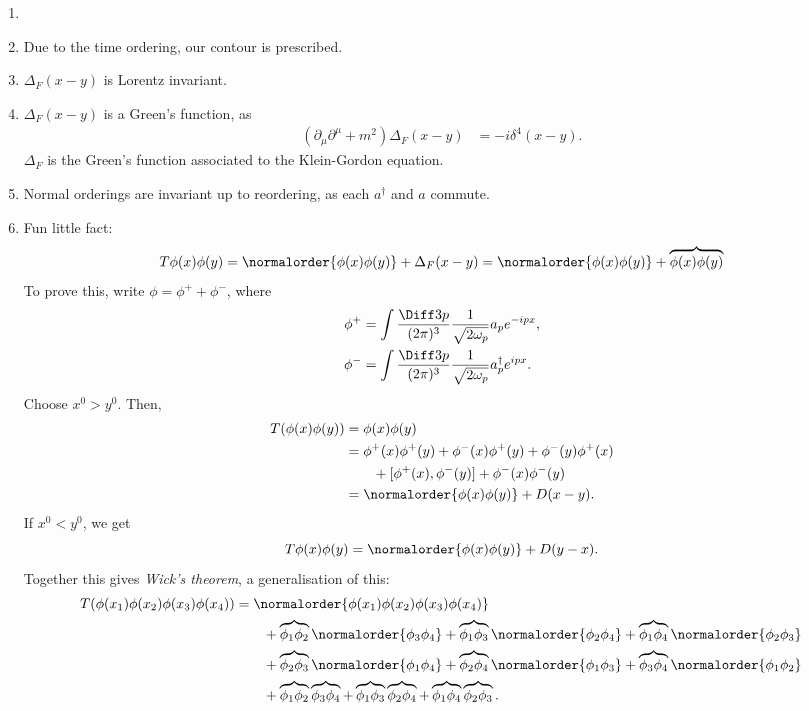 \documentclass[12pt]{article}
\begin{document}
\begin{remark}
	\begin{enumerate}
		\item[]
		\item Due to the time ordering, our contour is prescribed.
		\item $\Delta_F(x - y)$ is Lorentz invariant.
		\item $\Delta_F(x - y)$ is a Green's function, as
			\begin{align*}
				(\partial_\mu \partial^\mu + m^2)\Delta_F(x - y) &= -i \delta^{4}(x - y).
			\end{align*}
			$\Delta_F$ is the Green's function associated to the Klein-Gordon equation.
		\item Normal orderings are invariant up to reordering, as each $a^{\dagger}$ and $a$ commute.
		\item Fun little fact:
			\[
				T \phi(x) \phi(y) = \normalorder{\phi(x) \phi(y)} + \Delta_F(x - y) = \normalorder{\phi(x) \phi(y)} + \overbrace{\phi(x)\phi(y)}
			\]
			To prove this, write $\phi = \phi^{+} + \phi^{-}$, where 
			\begin{align*}
				\phi^{+} &= \int \frac{\Diff 3 p}{(2\pi)^3} \frac{1}{\sqrt{2 \omega_p}} a_p e^{-i p x}, \\
				\phi^{-} &= \int \frac{\Diff 3 p}{(2\pi)^3} \frac{1}{\sqrt{2 \omega_p}} a_p^{\dagger} e^{i p x}.
			\end{align*}
			Choose $x^0 > y^0$. Then,
			\begin{align*}
				T(\phi(x)\phi(y)) &= \phi(x)\phi(y) \\
						  &= \phi^{+}(x) \phi^{+}(y) + \phi^{-}(x) \phi^{+}(y) + \phi^{-}(y) \phi^{+}(x) \\
						  & \qquad + [\phi^{+}(x), \phi^{-}(y)] + \phi^{-}(x) \phi^{-}(y) \\
						  &= \normalorder{\phi(x) \phi(y)} + D(x - y).
			\end{align*}
			If $x^0 < y^0$, we get
			\[
			T \phi(x) \phi(y) = \normalorder{\phi(x)\phi(y)} + D(y - x).
			\]
			Together this gives \emph{Wick's theorem}, a generalisation of this:
			\begin{align*}
				T(\phi(x_1) \phi(x_2) \phi(x_3)\phi(x_4)) &= \normalorder{\phi(x_1)\phi(x_2)\phi(x_3)\phi(x_4)} \\
									  & \qquad + \overbrace{\phi_1 \phi_2} \normalorder{\phi_3 \phi_4} + \overbrace{\phi_1 \phi_3} \normalorder{\phi_2 \phi_4} + \overbrace{\phi_1 \phi_4} \normalorder{\phi_2\phi_3} \\
									  & \qquad + \overbrace{\phi_2\phi_3} \normalorder{\phi_1 \phi_4} + \overbrace{\phi_2 \phi_4} \normalorder{\phi_1\phi_3} + \overbrace{\phi_3\phi_4} \normalorder{\phi_1\phi_2} \\
									  & \qquad + \overbrace{\phi_1\phi_2} \overbrace{\phi_3 \phi_4} + \overbrace{\phi_1\phi_3} \overbrace{\phi_2\phi_4} + \overbrace{\phi_1\phi_4} \overbrace{\phi_2\phi_3}.
			\end{align*}
	\end{enumerate}
\end{remark}
\end{document}
